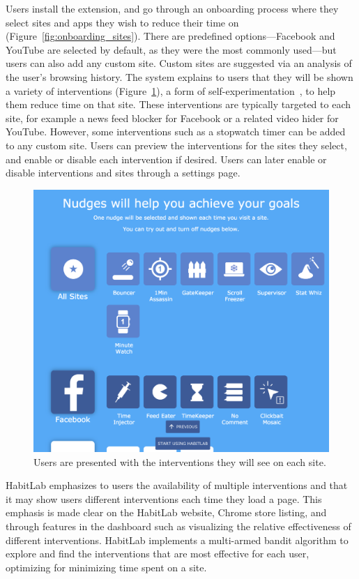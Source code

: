 Users install the extension, and go through an onboarding process where they select sites and apps they wish to reduce their time on (Figure~\ref{fig:onboarding_sites}). There are predefined options---Facebook and YouTube are selected by default, as they were the most commonly used---but users can also add any custom site. Custom sites are suggested via an analysis of the user's browsing history. The system explains to users that they will be shown a variety of interventions (Figure~\ref{fig:onboarding_nudges}), a form of self-experimentation~\cite{Karkar:2017:TFS:3025453.3025480}, to help them reduce time on that site. These interventions are typically targeted to each site, for example a news feed blocker for Facebook or a related video hider for YouTube. However, some interventions such as a stopwatch timer can be added to any custom site. Users can preview the interventions for the sites they select, and enable or disable each intervention if desired. Users can later enable or disable interventions and sites through a settings page.

\begin{figure}
\includegraphics[width=\linewidth]{figures/onboarding_nudges_short}
\caption{Users are presented with the interventions they will see on each site.}
  \label{fig:onboarding_nudges}
\end{figure}

HabitLab emphasizes to users the availability of multiple interventions and that it may show users different interventions each time they load a page. This emphasis is made clear on the HabitLab website, Chrome store listing, and through features in the dashboard such as visualizing the relative effectiveness of different interventions. HabitLab implements a multi-armed bandit algorithm to explore and find the interventions that are most effective for each user, optimizing for minimizing time spent on a site. %

